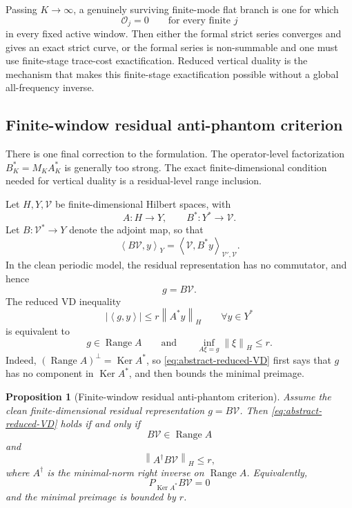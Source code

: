 \documentclass[11pt]{article}
\numberwithin{equation}{section}
\newtheorem{proposition}[theorem]{Proposition}
\DeclareMathOperator{\Range}{Range}
\DeclareMathOperator{\Ker}{Ker}
\newcommand{\norm}[2]{\left\|#1\right\|_{#2}}
\newcommand{\ip}[2]{\left\langle #1,#2\right\rangle}
\newcommand{\calO}{\mathcal O}
\newcommand{\calV}{\mathcal V}
\begin{document}
Passing \(K\to\infty\), a genuinely surviving finite-mode flat branch is one for which
\[
\calO_j=0
\qquad
\text{for every finite }j
\]
in every fixed active window.  Then either the formal strict series converges and gives an exact strict curve, or the formal series is non-summable and one must use finite-stage trace-cost exactification.  Reduced vertical duality is the mechanism that makes this finite-stage exactification possible without a global all-frequency inverse.

\subsection{Finite-window residual anti-phantom criterion}\label{subsec:residual-antiphantom-criterion}

There is one final correction to the formulation.  The operator-level factorization \(B_K^*=M_KA_K^*\) is generally too strong.  The exact finite-dimensional condition needed for vertical duality is a residual-level range inclusion.

Let \(H,Y,\calV\) be finite-dimensional Hilbert spaces, with
\[
A:H\to Y,
\qquad
B^*:Y^*\to\calV.
\]
Let \(B:\calV^*\to Y\) denote the adjoint map, so that
\[
\ip{B\calV}{y}_Y=\ip{\calV}{B^*y}_{\calV',\calV}.
\]
In the clean periodic model, the residual representation has no commutator, and hence
\begin{equation}\label{eq:gBcalV}
g=B\calV.
\end{equation}
The reduced VD inequality
\begin{equation}\label{eq:abstract-reduced-VD}
|\ip{g}{y}|
\le r\norm{A^*y}{H}
\qquad
\forall y\in Y^*
\end{equation}
is equivalent to
\begin{equation}\label{eq:range-inclusion}
g\in\Range A
\qquad\text{and}\qquad
\inf_{A\xi=g}\norm{\xi}{H}\le r.
\end{equation}
Indeed, \((\Range A)^\perp=\Ker A^*\), so \eqref{eq:abstract-reduced-VD} first says that \(g\) has no component in \(\Ker A^*\), and then bounds the minimal preimage.

\begin{proposition}[Finite-window residual anti-phantom criterion]\label{prop:finite-window-antiphantom}
Assume the clean finite-dimensional residual representation \(g=B\calV\).  Then \eqref{eq:abstract-reduced-VD} holds if and only if
\begin{equation}\label{eq:range-criterion-BV}
B\calV\in\Range A
\end{equation}
and
\begin{equation}\label{eq:pseudoinverse-bound}
\norm{A^\dagger B\calV}{H}\le r,
\end{equation}
where \(A^\dagger\) is the minimal-norm right inverse on \(\Range A\).  Equivalently,
\[
P_{\Ker A^*}B\calV=0
\]
and the minimal preimage is bounded by \(r\).
\end{proposition}
\end{document}
